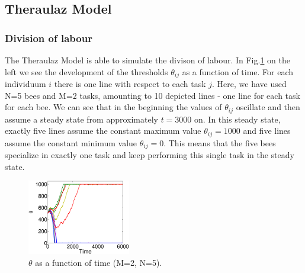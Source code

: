 
\subsection{Theraulaz Model}
\subsubsection*{Division of labour}
The Theraulaz Model is able to simulate the divison of labour. In Fig.\ref{fig:thetax} on the left we see the development of the thresholds $\theta_{ij}$ as a function of time. For each individuum $i$ there is one line with respect to each task $j$. Here, we have used N=5 bees and M=2 tasks, amounting to 10 depicted lines - one line for each task for each bee. We can see that in the beginning the values of $\theta_{ij}$ oscillate and then assume a steady state from approximately $t=3000$ on. In this steady state, exactly five lines assume the constant maximum value $\theta_{ij}=1000$ and five lines assume the constant minimum value $\theta_{ij}=0$. This means that the five bees specialize in exactly one task and keep performing this single task in the steady state.

\begin{figure}[ht!]
	\centering
	\includegraphics[width=0.4\textwidth]{figures/thetax.eps}
	\caption{$\theta$ as a function of time (M=2, N=5).}
	\label{fig:thetax}
\end{figure}

